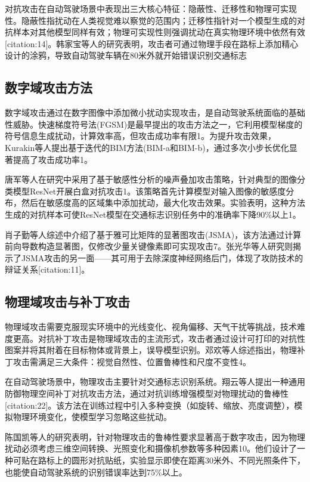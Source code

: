 \documentclass[acmtog]{ctexart}
\begin{document}
对抗攻击在自动驾驶场景中表现出三大核心特征：隐蔽性、迁移性和物理可实现性。隐蔽性指扰动在人类视觉难以察觉的范围内；迁移性指针对一个模型生成的对抗样本对其他模型同样有效；物理可实现性则强调扰动在真实物理环境中依然有效[citation:14]。韩家宝等人的研究表明，攻击者可通过物理手段在路标上添加精心设计的涂鸦，导致自动驾驶车辆在80米外就开始错误识别交通标志

\subsection{数字域攻击方法}

数字域攻击通过在数字图像中添加微小扰动实现攻击，是自动驾驶系统面临的基础性威胁。快速梯度符号法(FGSM)是最早提出的攻击方法之一，它利用模型梯度的符号信息生成扰动，计算效率高，但攻击成功率有限1。为提升攻击效果，Kurakin等人提出基于迭代的BIM方法(BIM-a和BIM-b)，通过多次小步长优化显著提高了攻击成功率1。

唐军等人在研究中采用了基于敏感性分析的噪声叠加攻击策略，针对典型的图像分类模型ResNet开展白盒对抗攻击1。该策略首先计算模型对输入图像的敏感度分布，然后在敏感度高的区域集中添加扰动，最大化攻击效果。实验表明，这种方法生成的对抗样本可使ResNet模型在交通标志识别任务中的准确率下降90\%以上1。

肖子勤等人综述中介绍了基于雅可比矩阵的显著图攻击(JSMA)，该方法通过计算前向导数构造显著图，仅修改少量关键像素即可实现攻击7。张光华等人研究则揭示了JSMA攻击的另一面——其可用于去除深度神经网络后门，体现了攻防技术的辩证关系[citation:11]。

\subsection{物理域攻击与补丁攻击}

物理域攻击需要克服现实环境中的光线变化、视角偏移、天气干扰等挑战，技术难度更高。对抗补丁攻击是物理域攻击的主流形式，攻击者通过设计可打印的对抗性图案并将其附着在目标物体或背景上，误导模型识别。邓欢等人综述指出，物理补丁攻击需满足三大条件：视觉自然性、位置鲁棒性和尺度不变性4。

在自动驾驶场景中，物理攻击主要针对交通标志识别系统。翔云等人提出一种通用防御物理空间补丁对抗攻击方法，通过对抗训练增强模型对物理扰动的鲁棒性[citation:22]。该方法在训练过程中引入多种变换（如旋转、缩放、亮度调整），模拟物理环境变化，使模型学习忽略这些扰动。

陈国凯等人的研究表明，针对物理攻击的鲁棒性要求显著高于数字攻击，因为物理扰动必须考虑三维空间转换、光照变化和摄像机参数等多种因素10。他们设计了一种可贴在路标上的圆形对抗贴纸，实验显示即使在距离30米外、不同光照条件下，也能使自动驾驶系统的识别错误率达到75\%以上。
\end{document}
